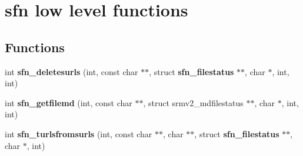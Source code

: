 \section{sfn low level functions}
\label{group__sfn__low__group}
\subsection*{Functions}
\begin{DoxyCompactItemize}
\item 
int {\bfseries sfn\_\-deletesurls} (int, const char $\ast$$\ast$, struct {\bf sfn\_\-filestatus} $\ast$$\ast$, char $\ast$, int, int)\label{group__sfn__low__group_gaa17576ff6424ffc3f13cbdf69e5f294b}

\item 
int {\bfseries sfn\_\-getfilemd} (int, const char $\ast$$\ast$, struct srmv2\_\-mdfilestatus $\ast$$\ast$, char $\ast$, int, int)\label{group__sfn__low__group_ga7d0bafba4b5097accaac96f4d61e0c14}

\item 
int {\bfseries sfn\_\-turlsfromsurls} (int, const char $\ast$$\ast$, char $\ast$$\ast$, struct {\bf sfn\_\-filestatus} $\ast$$\ast$, char $\ast$, int)\label{group__sfn__low__group_gae9ff047ad7cdbf1c81b8421d621ff123}

\end{DoxyCompactItemize}
